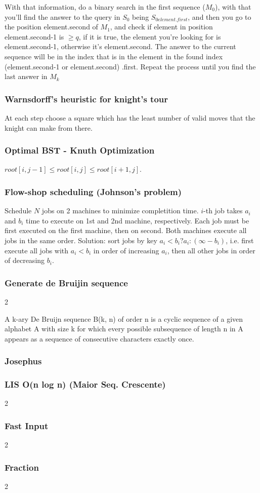 \documentclass[a4paper,12pt]{article}
\newcommand\includefile[4]{
  \subsubsection{#2}
  \begin{multicols}{2}
    
  \end{multicols}
}
\begin{document}
With that information, do a binary search in the first sequence ($M_{0}$), with that you'll find the answer to the query in $S_{0}$ being $S_{0{element.first}}$, and then you go to the position element.second of $M_{1}$, and check if element in position element.second-1 is $\geq q$, if it is true, the element you're looking for is element.second-1, otherwise it's element.second. The answer to the current sequence will be in the index that is in the element in the found index (element.second-1 or element.second) .first. Repeat the process until you find the last answer in $M_{k}$

\subsubsection{Warnsdorff’s heuristic for knight’s tour}
At each step choose a square which has the least number of valid moves that the knight can make from there.

\subsubsection{Optimal BST - Knuth Optimization}
$root[i, j - 1] \leq root[i, j] \leq root[i + 1, j]$.

\subsubsection{Flow-shop scheduling (Johnson’s problem)}
Schedule $N$ jobs on 2 machines to minimize completition time. $i$-th job takes $a_i$ and $b_i$ time to execute on 1st and 2nd machine, respectively.
Each job must be first executed on the first machine, then on second. Both machines execute all jobs in the same order. Solution: sort jobs by key $a_i < b_i ? a_i : (\infty - b_i)$,
i.e. first execute all jobs with $a_i < b_i$ in order of increasing $a_i$, then all other jobs in order of decreasing $b_i$.

\includefile{c++}{Generate de Bruijin sequence}{misc}{debruijn.cpp}
A k-ary De Bruijn sequence B(k, n) of order n is a cyclic sequence of a given alphabet A with size k for which every possible subsequence of length n in A appears as a sequence of consecutive characters exactly once.

\subsubsection{Josephus}


\includefile{c++}{LIS O(n log n) (Maior Seq. Crescente)}{misc}{lis.cpp}
\includefile{c++}{Fast Input}{misc}{fast_input.cpp}
\includefile{c++}{Fraction}{misc}{fraction.cpp}
\end{document}
